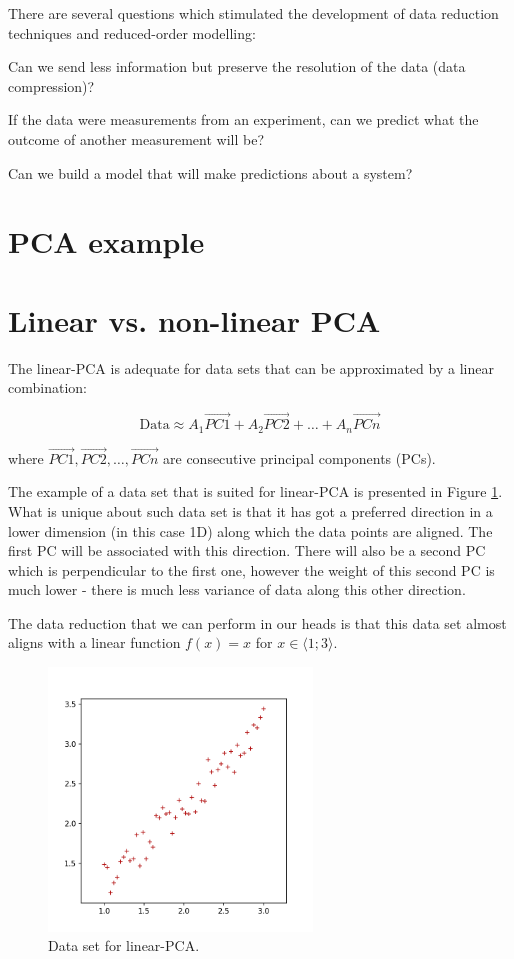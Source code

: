 \documentclass[20pt,twocolumn]{article}
\begin{document}
There are several questions which stimulated the development of data reduction techniques and reduced-order modelling:

Can we send less information but preserve the resolution of the data (data compression)?

If the data were measurements from an experiment, can we predict what the outcome of another measurement will be?

Can we build a model that will make predictions about a system?

\section{PCA example}

\section{Linear vs. non-linear PCA}

The linear-PCA is adequate for data sets that can be approximated by a linear combination:

\begin{equation}
\text{Data} \approx A_1 \vec{PC1} + A_2 \vec{PC2} + \dots + A_n \vec{PCn}
\end{equation}

where $\vec{PC1}, \vec{PC2}, \dots, \vec{PCn}$ are consecutive principal components (PCs).

The example of a data set that is suited for linear-PCA is presented in Figure \ref{fig:linear_PCA_data}. What is unique about such data set is that it has got a preferred direction in a lower dimension (in this case 1D) along which the data points are aligned. The first PC will be associated with this direction. There will also be a second PC which is perpendicular to the first one, however the weight of this second PC is much lower - there is much less variance of data along this other direction.

The data reduction that we can perform in our heads is that this data set almost aligns with a linear function $f(x) = x$ for $x \in \langle 1; 3 \rangle$.

\begin{figure}[H]
\centering\includegraphics[width=7cm]{../python/PCA-fake-datasets/PCA_linear_scatter_1.png}
\caption{Data set for linear-PCA.}			
\label{fig:linear_PCA_data}
\end{figure}
\end{document}
